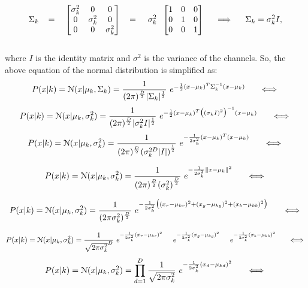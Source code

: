 \documentclass[11pt]{article}
\begin{document}
$$\Sigma_k \hspace{3mm}=\hspace{3.5mm} \begin{bmatrix} \sigma_k^2 & 0 & 0 \\ 0 & \sigma_k^2 & 0 \\ 0 & 0 & \sigma_k^2 \end{bmatrix} \hspace{3mm} = \hspace{4mm}\sigma_k^2 \hspace{2mm}\begin{bmatrix} 1 & 0 & 0 \\ 0 & 1 & 0 \\ 0 & 0 & 1 \end{bmatrix} \hspace{0.5cm}\Longrightarrow \hspace{0.5cm} \Sigma_k = \sigma_k^2 I, $$ \\

\noindent where $I$ is the identity matrix and $\sigma^2$ is the variance of the channels. 
\newpage 
\noindent So, the above equation of the normal distribution is simplified as:
$$
P(x|k) =  \mathcal{N} (x|\mu_{k}, \Sigma_{k}) = \frac{1}{(2 \pi)^{\frac{D}{2}}|\Sigma_k|^{\frac{1}{2}}}\
e^{-\frac{1}{2} (x-\mu_k)^T \Sigma_k^{-1}(x-\mu_k)} \hspace{0.5cm}	\iff
$$
$$
P(x|k) = \mathcal{N} (x|\mu_{k}, \sigma_{k}^2) = \frac{1}{(2 \pi)^{\frac{D}{2}}|\sigma_k^2 I|^{ \frac{1}{2}}}\
e^{-\frac{1}{2} (x-\mu_k)^T {\big({(\sigma_k I)}^2\big)}^{-1}(x-\mu_k)}\hspace{0.5cm} \iff
$$
$$
P(x|k) = \mathcal{N} (x|\mu_{k}, \sigma_{k}^2)= \frac{1}{(2 \pi)^{\frac{D}{2}} {({\sigma_k^{2D}} |I|)} ^{\frac{1}{2}}}\
e^{-\frac{1}{2\sigma_k^2} (x-\mu_k)^T (x-\mu_k)}\hspace{0.5cm}\iff
$$

$$
P(x|k) = \mathcal{N} (x|\mu_{k}, \sigma_{k}^2) = \frac{1}{(2 \pi)^{\frac{D}{2}}{(\sigma_k^2)}^{\frac{D}{2}}}\
e^{-\frac{1}{2\sigma_k^2} {\lVert{x-\mu_k}\rVert}^2}\hspace{0.5cm}\iff
$$

$$
P(x|k) =  \mathcal{N} (x|\mu_{k}, \sigma_{k}^2) = \frac{1}{(2 \pi \sigma_k^2)^{\frac{D}{2}}}\
e^{-\frac{1}{2\sigma_k^2} \big((x_r - \mu_{kr})^2 + (x_g - \mu_{kg})^2 + (x_b - \mu_{kb})^2 \big)}\hspace{0.5cm}\iff
$$

$$
P(x|k) =  \mathcal{N} (x|\mu_{k}, \sigma_{k}^2) = \frac{1}{\sqrt{2 \pi \sigma_k^2}^D}\
e^{-\frac{1}{2\sigma_k^2} (x_r - \mu_{kr})^2 }\hspace{5mm} e^{-\frac{1}{2\sigma_k^2} (x_g - \mu_{kg})^2 }\hspace{5mm} e^{-\frac{1}{2\sigma_k^2} (x_b - \mu_{kb})^2 }\hspace{0.5cm}\iff
$$
$$
P(x|k) =  \mathcal{N} (x|\mu_{k}, \sigma_{k}^2) = \prod_{d=1}^{D} \frac{1}{\sqrt{2 \pi \sigma_k^2}}\
e^{-\frac{1}{2\sigma_k^2} (x_d - \mu_{kd})^2 } \hspace{0.5cm}\iff
$$
\end{document}
